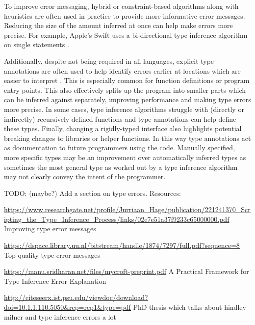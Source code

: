 \documentclass[a4paper,fleqn,oneside,12pt]{report}
\begin{document}
To improve error messaging, hybrid or constraint-based algorithms along with heuristics are often used in practice to provide more informative error messages. Reducing the size of the amount inferred at once can help make errors more precise. For example, Apple’s Swift uses a bi-directional type inference algorithm on single statements \citep{ref24}.

Additionally, despite not being required in all languages, explicit type annotations are often used to help identify errors earlier at locations which are easier to interpret \citep{ref35}. This is especially common for function definitions or program entry points. This also effectively splits up the program into smaller parts which can be inferred against separately, improving performance and making type errors more precise. In some cases, type inference algorithms struggle with (directly or indirectly) recursively defined functions and type annotations can help define these types. Finally, changing a rigidly-typed interface also highlights potential breaking changes to libraries or helper functions. In this way type annotations act as documentation to future programmers using the code. Manually specified, more specific types may be an improvement over automatically inferred types as sometimes the most general type as worked out by a type inference algorithm may not clearly convey the intent of the programmer.

TODO: (maybe?) Add a section on type errors. Resources:

\underline{\href{https://www.researchgate.net/profile/Jurriaan\_Hage/publication/221241370\_Scripting\_the\_Type\_Inference\_Process/links/02e7e51a37f9233c65000000.pdf}{https://www.researchgate.net/profile/Jurriaan\_Hage/publication/221241370\_Scripting\_the\_Type\_Inference\_Process/links/02e7e51a37f9233c65000000.pdf}}
Improving type error messages

\underline{\href{https://dspace.library.uu.nl/bitstream/handle/1874/7297/full.pdf?sequence=8}{https://dspace.library.uu.nl/bitstream/handle/1874/7297/full.pdf?sequence=8}}
Top quality type error messages

\underline{\href{https://manu.sridharan.net/files/mycroft-preprint.pdf}{https://manu.sridharan.net/files/mycroft-preprint.pdf}}
A Practical Framework for Type Inference Error Explanation

\underline{\href{http://citeseerx.ist.psu.edu/viewdoc/download?doi=10.1.1.110.5050\&rep=rep1\&type=pdf}{http://citeseerx.ist.psu.edu/viewdoc/download?doi=10.1.1.110.5050\&rep=rep1\&type=pdf}}
PhD thesis which talks about hindley milner and type inference errors a lot
\end{document}
